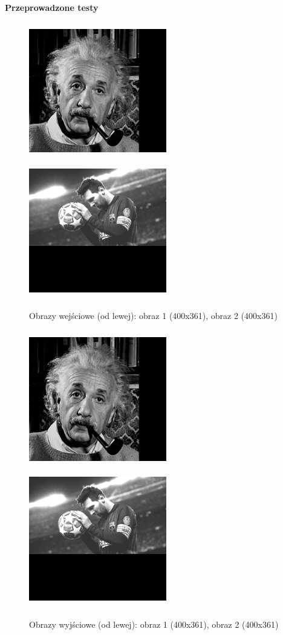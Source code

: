 \documentclass[magisterska,openany]{pracadypl}
\begin{document}
\newpage
\vspace{0.25cm}\textbf{\Large Przeprowadzone testy}
\vspace{0.5cm}
\begin{figure}[h]
\centering
\includegraphics[width=6cm, height=6cm]{2_1/GeoG1.jpg}
\includegraphics[width=6cm, height=6cm]{2_1/GeoG2.jpg}
\caption{Obrazy wejściowe (od lewej): obraz 1 (400x361), obraz 2 (400x361) }
\end{figure}
\begin{figure}[h]
\centering
\includegraphics[width=6cm, height=6cm]{2_2/ResolG1.jpg}
\includegraphics[width=6cm, height=6cm]{2_2/ResolG2.jpg}
\caption{Obrazy wyjściowe (od lewej): obraz 1 (400x361), obraz 2 (400x361) }
\end{figure}
\end{document}
